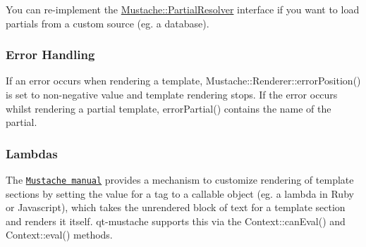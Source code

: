 You can re-\/implement the {\ttfamily \hyperlink{classMustache_1_1PartialResolver}{Mustache\+::\+Partial\+Resolver}} interface if you want to load partials from a custom source (eg. a database).

\subsubsection*{Error Handling}

If an error occurs when rendering a template, {\ttfamily Mustache\+::\+Renderer\+::error\+Position()} is set to non-\/negative value and template rendering stops. If the error occurs whilst rendering a partial template, {\ttfamily error\+Partial()} contains the name of the partial.

\subsubsection*{Lambdas}

The \href{http://mustache.github.com/mustache.5.html}{\tt Mustache manual} provides a mechanism to customize rendering of template sections by setting the value for a tag to a callable object (eg. a lambda in Ruby or Javascript), which takes the unrendered block of text for a template section and renders it itself. qt-\/mustache supports this via the {\ttfamily Context\+::can\+Eval()} and {\ttfamily Context\+::eval()} methods. 